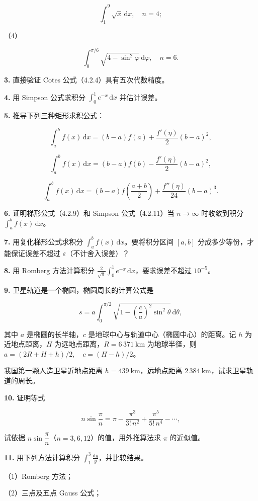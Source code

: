 \documentclass[
  10pt,
  fontset=fandol]{ctexart}
\begin{document}
\[
\int_1^9\sqrt{x}\,\mathrm{d}x,\quad n=4;
\]

（4）

\[
\int_0^{\pi/6}\sqrt{4-\sin^2\varphi}\,\mathrm{d}\varphi,\quad n=6.
\]

\textbf{3.} 直接验证 Cotes 公式（4.2.4）具有五次代数精度。

\textbf{4.} 用 Simpson 公式求积分 \(\displaystyle\int_0^1 e^{-x}\,\mathrm{d}x\) 并估计误差。

\textbf{5.} 推导下列三种矩形求积公式：

\[
\int_a^b f(x)\,\mathrm{d}x=(b-a)f(a)+\frac{f'(\eta)}2(b-a)^2,
\]

\[
\int_a^b f(x)\,\mathrm{d}x=(b-a)f(b)-\frac{f'(\eta)}2(b-a)^2,
\]

\[
\int_a^b f(x)\,\mathrm{d}x=(b-a)f\left(\frac{a+b}2\right)+\frac{f''(\eta)}{24}(b-a)^3.
\]

\textbf{6.} 证明梯形公式（4.2.9）和 Simpson 公式（4.2.11）当 \(n\to\infty\) 时收敛到积分 \(\displaystyle\int_a^b f(x)\,\mathrm{d}x\)。

\textbf{7.} 用复化梯形公式求积分 \(\displaystyle\int_a^b f(x)\,\mathrm{d}x\)。要将积分区间 \([a,b]\) 分成多少等份，才能保证误差不超过 \(\varepsilon\)（不计舍入误差）？

\textbf{8.} 用 Romberg 方法计算积分 \(\displaystyle\frac2{\sqrt\pi}\int_0^1 e^{-x}\,\mathrm{d}x\)，要求误差不超过 \(10^{-5}\)。

\textbf{9.} 卫星轨道是一个椭圆，椭圆周长的计算公式是

\[
s=a\int_0^{\pi/2}\sqrt{1-\left(\frac ca\right)^2\sin^2\theta}\,\mathrm{d}\theta,
\]

其中 \(a\) 是椭圆的长半轴，\(c\) 是地球中心与轨道中心（椭圆中心）的距离。记 \(h\) 为近地点距离，\(H\) 为远地点距离，\(R=6\,371\ \mathrm{km}\) 为地球半径，则 \(a=(2R+H+h)/2,\quad c=(H-h)/2\)。

我国第一颗人造卫星近地点距离 \(h=439\ \mathrm{km}\)，远地点距离 \(2\,384\ \mathrm{km}\)，试求卫星轨道的周长。

\textbf{10.} 证明等式

\[
n\sin\frac\pi n=\pi-\frac{\pi^3}{3!\,n^2}+\frac{\pi^5}{5!\,n^4}-\cdots,
\]

试依据 \(n\sin\dfrac\pi n\)（\(n=3,6,12\)）的值，用外推算法求 \(\pi\) 的近似值。

\textbf{11.} 用下列方法计算积分 \(\displaystyle\int_1^3\frac{\mathrm{d}y}{y}\)，并比较结果。

（1）Romberg 方法；

（2）三点及五点 Gauss 公式；
\end{document}
